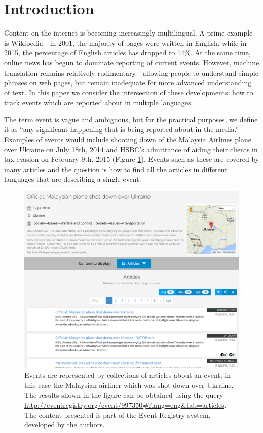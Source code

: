 \documentclass[twoside,11pt]{article}
\begin{document}
\section{Introduction}

Content on the internet is becoming increasingly multilingual. A prime example is Wikipedia - in 2001, the majority of pages were written in English, while in 2015, the percentage of English articles has dropped to 14\%. At the same time, online news has begun to dominate reporting of current events. However, machine translation remains relatively rudimentary - allowing people to understand simple phrases on web pages, but remain inadequate for more advanced understanding of text. In this paper we consider the intersection of these developments: how to track events which are reported about in multiple languages.

The term event is vague and ambiguous, but for the practical purposes, we define it as ``any significant happening that is being reported about in the media.'' Examples of events would include shooting down of the Malaysia Airlines plane over Ukraine on July 18th, 2014 and HSBC's admittance of aiding their clients in tax evasion on February 9th, 2015 (Figure \ref{fig:event2}). Events such as these are covered by many articles and the question is how to find all the articles in different languages that are describing a single event.

\begin{figure}
\centering
\includegraphics[width=1\textwidth]{events2.png}
\caption{\label{fig:event2} Events are represented by collections of articles about an event, in this case the Malaysian airliner which was shot down over Ukraine. The results shown in the figure can be obtained using the query \url{http://eventregistry.org/event/997350\#?lang=eng\&tab=articles}. The content presented is part of the Event Registry system, developed by the authors.}
\end{figure}
\end{document}
